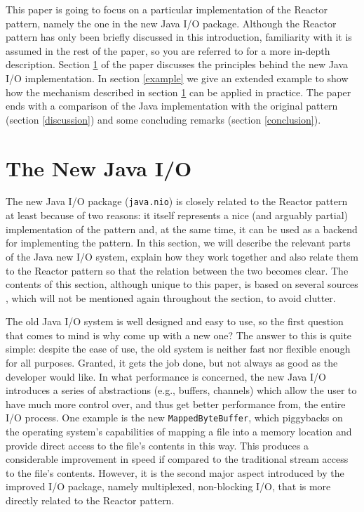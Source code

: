\documentclass[a4paper,10pt]{article}
\begin{document}
This paper is going to focus on a particular implementation of the Reactor pattern, namely the one in the new
Java I/O package. Although the Reactor pattern has only been briefly discussed in this introduction, familiarity
with it is assumed in the rest of the paper, so you are referred to \cite{218705} for a more in-depth description.
Section \ref{newio} of the paper discusses the principles behind the new Java I/O implementation. In section
\ref{example} we give an extended example to show how the mechanism described in section \ref{newio} can
be applied in practice. The paper ends with a comparison of the Java implementation with the original pattern
(section \ref{discussion}) and some concluding remarks (section \ref{conclusion}).

\section{The New Java I/O}
\label{newio}

The new Java I/O package (\texttt{java.nio}) is closely related to the Reactor pattern at least because of two reasons:
it itself represents  a nice (and arguably partial) implementation of the pattern and, at the same time, it can be used
as a backend for implementing the pattern. In this section, we will describe the relevant parts of the Java new I/O system,
explain how they work together and also relate them to the Reactor pattern so that the relation between the two
becomes clear. The contents of this section, although unique to this paper, is based on several sources \cite{tiej, merlin, javadoc},
which will not be mentioned again throughout the section, to avoid clutter.

The old Java I/O system is well designed and easy to use, so the first question that comes to mind is why come up
with a new one? The answer to this is quite simple: despite the ease of use, the old system is neither fast nor flexible
enough for all purposes. Granted, it gets the job done, but not always as good as the developer would like. In what
performance is concerned, the new Java I/O introduces a series of abstractions (e.g., buffers, channels) which allow
the user to have much more control over, and thus get better performance from, the entire I/O process. One example
is the new \texttt{MappedByteBuffer}, which piggybacks on the operating system's capabilities of mapping a file into
a memory location and provide direct access to the file's contents in this way. This produces a considerable improvement
in speed if compared to the traditional stream access to the file's contents. However, it is the second major aspect
introduced by the improved I/O package, namely multiplexed, non-blocking I/O, that is more directly related to the Reactor
pattern.
\end{document}
